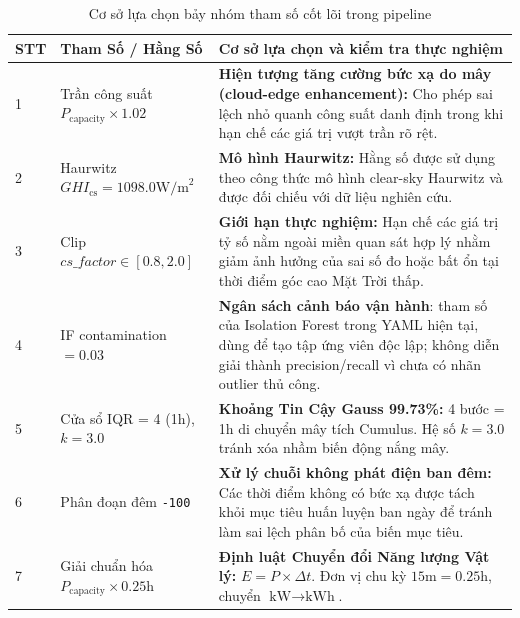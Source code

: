 \documentclass[12pt,a4paper]{article}
\begin{document}
\begin{table}[htbp]
\centering
\caption{Cơ sở lựa chọn bảy nhóm tham số cốt lõi trong pipeline}
\label{tab:hardcoded_params_proof}
\scriptsize
\begin{tabularx}{\linewidth}{l l X}
\toprule
\textbf{STT} & \textbf{Tham Số / Hằng Số} & \textbf{Cơ sở lựa chọn và kiểm tra thực nghiệm} \\
\midrule
1 & Trần công suất $P_{\text{capacity}} \times 1.02$ & \textbf{Hiện tượng tăng cường bức xạ do mây (cloud-edge enhancement):} Cho phép sai lệch nhỏ quanh công suất danh định trong khi hạn chế các giá trị vượt trần rõ rệt. \\
2 & Haurwitz $GHI_{\text{cs}} = 1098.0\text{W/m}^2$ & \textbf{Mô hình Haurwitz:} Hằng số được sử dụng theo công thức mô hình clear-sky Haurwitz và được đối chiếu với dữ liệu nghiên cứu. \\
3 & Clip $cs\_factor \in [0.8, 2.0]$ & \textbf{Giới hạn thực nghiệm:} Hạn chế các giá trị tỷ số nằm ngoài miền quan sát hợp lý nhằm giảm ảnh hưởng của sai số đo hoặc bất ổn tại thời điểm góc cao Mặt Trời thấp. \\
4 & IF contamination $=0.03$ & \textbf{Ngân sách cảnh báo vận hành}: tham số của Isolation Forest trong YAML hiện tại, dùng để tạo tập ứng viên độc lập; không diễn giải thành precision/recall vì chưa có nhãn outlier thủ công. \\
5 & Cửa sổ IQR = 4 (1h), $k = 3.0$ & \textbf{Khoảng Tin Cậy Gauss 99.73\%:} 4 bước = 1h di chuyển mây tích Cumulus. Hệ số $k=3.0$ tránh xóa nhầm biến động nắng mây. \\
6 & Phân đoạn đêm \texttt{-100} & \textbf{Xử lý chuỗi không phát điện ban đêm:} Các thời điểm không có bức xạ được tách khỏi mục tiêu huấn luyện ban ngày để tránh làm sai lệch phân bố của biến mục tiêu. \\
7 & Giải chuẩn hóa $P_{\text{capacity}} \times 0.25\text{h}$ & \textbf{Định luật Chuyển đổi Năng lượng Vật lý:} $E = P \times \Delta t$. Đơn vị chu kỳ $15\text{m} = 0.25\text{h}$, chuyển $\text{kW} \rightarrow \text{kWh}$. \\
\bottomrule
\end{tabularx}
\end{table}
\end{document}
